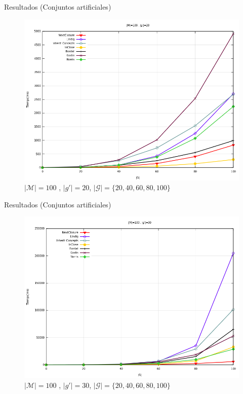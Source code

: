 \documentclass{beamer}
\newcommand{\M}{\mathcal{M}}
\newcommand{\G}{\mathcal{G}}
\begin{document}
       \begin{frame}{Resultados (Conjuntos artificiales)}
      \begin{figure}[H]
      \centering
      \includegraphics[scale=0.3]{images/M100g20G20100.png}
      \caption{$|\M|=100$ , $|g'|=20$, $|\G|=\{20,40,60,80,100\}$}
     \end{figure}
  \end{frame}
  
    \begin{frame}{Resultados (Conjuntos artificiales)}
      \begin{figure}[H]
      \centering
      \includegraphics[scale=0.3]{images/M100g30G20100.png}
      \caption{$|\M|=100$ , $|g'|=30$, $|\G|=\{20,40,60,80,100\}$}
     \end{figure}
  \end{frame}
  
\end{document}

